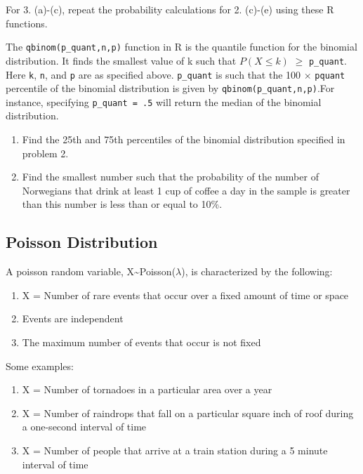 \documentclass[]{article}
\begin{document}
For 3. (a)-(c), repeat the probability calculations for 2. (c)-(e) using
these R functions.

The \texttt{qbinom(p\_quant,n,p)} function in R is the quantile function
for the binomial distribution. It finds the smallest value of k such
that \(P(X \le k)\) \(\ge\) \texttt{p\_quant}. Here \texttt{k},
\texttt{n}, and \texttt{p} are as specified above. \texttt{p\_quant} is
such that the 100 \(\times\) \texttt{pquant} percentile of the binomial
distribution is given by \texttt{qbinom(p\_quant,n,p)}.For instance,
specifying \texttt{p\_quant\ =\ .5} will return the median of the
binomial distribution.

\begin{enumerate}
\def\labelenumi{\alph{enumi})}
\setcounter{enumi}{3}
\item
  Find the 25th and 75th percentiles of the binomial distribution
  specified in problem 2.
\item
  Find the smallest number such that the probability of the number of
  Norwegians that drink at least 1 cup of coffee a day in the sample is
  greater than this number is less than or equal to 10\%.
\end{enumerate}

\hypertarget{poisson-distribution}{%
\subsection{Poisson Distribution}\label{poisson-distribution}}

A poisson random variable, X\textasciitilde Poisson(\(\lambda\)), is
characterized by the following:

\begin{enumerate}
\def\labelenumi{\arabic{enumi}.}
\item
  X = Number of rare events that occur over a fixed amount of time or
  space
\item
  Events are independent
\item
  The maximum number of events that occur is not fixed
\end{enumerate}

Some examples:

\begin{enumerate}
\def\labelenumi{\arabic{enumi}.}
\item
  X = Number of tornadoes in a particular area over a year
\item
  X = Number of raindrops that fall on a particular square inch of roof
  during a one-second interval of time
\item
  X = Number of people that arrive at a train station during a 5 minute
  interval of time
\end{enumerate}
\end{document}
